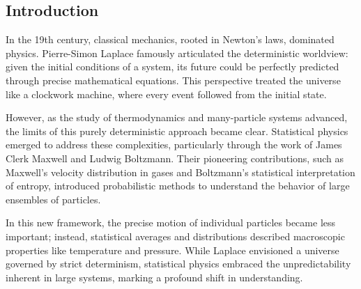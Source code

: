 \documentclass[ansiapaper]{report}
\author{Andrea}
\begin{document}



\fontsize{9}{10}\selectfont%

\renewcommand{\contentsname}{Contents} %


\vskip6pt
\begin{center}
  \noindent {}
\end{center}
\vskip9pt

\begin{multicols}{3}

  \renewcommand{\baselinestretch}{1.1}\normalsize %
  {\footnotesize \sffamily \tableofcontents} %



  \renewcommand{\baselinestretch}{1.0}\normalsize

  \fontsize{9}{10}\selectfont
  \chapter{Introduction}
  In the 19th century, classical mechanics, rooted in Newton’s laws, dominated physics. Pierre-Simon Laplace famously articulated the deterministic worldview: given the initial conditions of a system, its future could be perfectly predicted through precise mathematical equations. This perspective treated the universe like a clockwork machine, where every event followed from the initial state.

  However, as the study of thermodynamics and many-particle systems advanced, the limits of this purely deterministic approach became clear. Statistical physics emerged to address these complexities, particularly through the work of James Clerk Maxwell and Ludwig Boltzmann. Their pioneering contributions, such as Maxwell's velocity distribution in gases and Boltzmann's statistical interpretation of entropy, introduced probabilistic methods to understand the behavior of large ensembles of particles.

  In this new framework, the precise motion of individual particles became less important; instead, statistical averages and distributions described macroscopic properties like temperature and pressure. While Laplace envisioned a universe governed by strict determinism, statistical physics embraced the unpredictability inherent in large systems, marking a profound shift in understanding.


\end{multicols}
\end{document}
